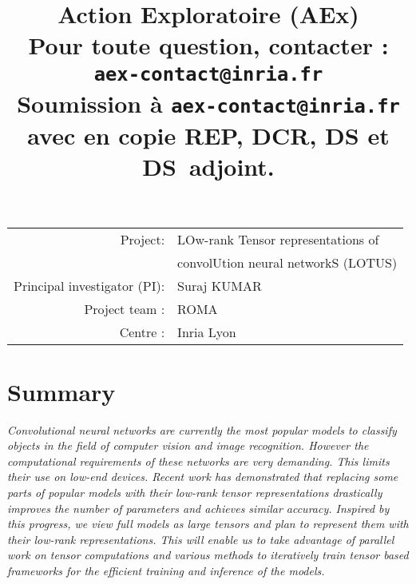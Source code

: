 \documentclass[11pt]{article}
\title{Action Exploratoire (AEx) \\
 {\normalsize Pour toute question, contacter : \texttt{aex-contact@inria.fr}} \\
  {\normalsize Soumission à \texttt{aex-contact@inria.fr}} \\ {\normalsize avec en copie REP, DCR, DS et DS~adjoint.} }
\author{}
\date{}
\begin{document}
\maketitle


\newcommand{\prname}{LOTUS\xspace}

	\begin{tabular}{rl}
		Project: & {\sc LOw-rank Tensor representations of}\\
		& {\sc convolUtion neural networkS (LOTUS)}\\
		Principal investigator (PI): & Suraj KUMAR\\
		Project team :&  ROMA\\
		Centre :& Inria Lyon
	\end{tabular}


\section*{Summary}
	\emph{Convolutional neural networks are currently the most popular models to classify objects in the field of computer vision and image recognition. However the computational requirements of these networks are very demanding. This limits their use on low-end devices. Recent work has demonstrated that replacing some parts of popular models with their low-rank tensor representations drastically improves the number of parameters and achieves similar accuracy. Inspired by this progress, we view full models as large tensors and plan to represent them with their low-rank representations. This will enable us to take advantage of parallel work on tensor computations and various methods to iteratively train tensor based frameworks for the efficient training and inference of the models.}
\end{document}
